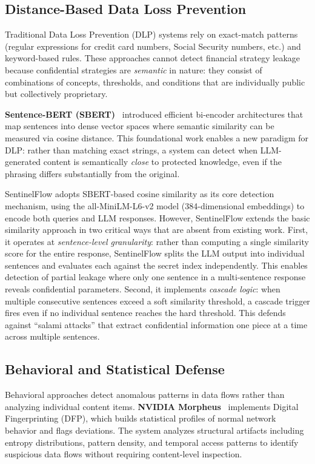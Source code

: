 \documentclass[journal]{IEEEtran}
\begin{document}
\subsection{Distance-Based Data Loss Prevention}
\label{Sect:LR_DLP}

Traditional Data Loss Prevention (DLP) systems rely on exact-match patterns (regular expressions for credit card numbers, Social Security numbers, etc.) and keyword-based rules. These approaches cannot detect financial strategy leakage because confidential strategies are \textit{semantic} in nature: they consist of combinations of concepts, thresholds, and conditions that are individually public but collectively proprietary.

\textbf{Sentence-BERT (SBERT)}~\cite{sbert} introduced efficient bi-encoder architectures that map sentences into dense vector spaces where semantic similarity can be measured via cosine distance. This foundational work enables a new paradigm for DLP: rather than matching exact strings, a system can detect when LLM-generated content is semantically \textit{close} to protected knowledge, even if the phrasing differs substantially from the original.

SentinelFlow adopts SBERT-based cosine similarity as its core detection mechanism, using the all-MiniLM-L6-v2 model (384-dimensional embeddings) to encode both queries and LLM responses. However, SentinelFlow extends the basic similarity approach in two critical ways that are absent from existing work. First, it operates at \textit{sentence-level granularity}: rather than computing a single similarity score for the entire response, SentinelFlow splits the LLM output into individual sentences and evaluates each against the secret index independently. This enables detection of partial leakage where only one sentence in a multi-sentence response reveals confidential parameters. Second, it implements \textit{cascade logic}: when multiple consecutive sentences exceed a soft similarity threshold, a cascade trigger fires even if no individual sentence reaches the hard threshold. This defends against ``salami attacks'' that extract confidential information one piece at a time across multiple sentences.

\subsection{Behavioral and Statistical Defense}
\label{Sect:LR_Behavioral}

Behavioral approaches detect anomalous patterns in data flows rather than analyzing individual content items. \textbf{NVIDIA Morpheus}~\cite{nvidia_morpheus} implements Digital Fingerprinting (DFP), which builds statistical profiles of normal network behavior and flags deviations. The system analyzes structural artifacts including entropy distributions, pattern density, and temporal access patterns to identify suspicious data flows without requiring content-level inspection.
\end{document}
